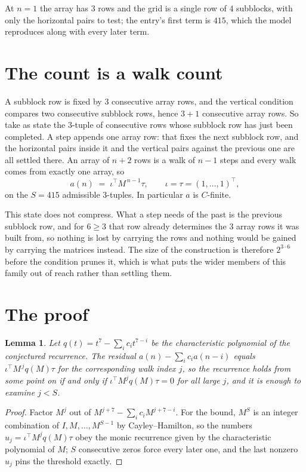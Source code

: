 \documentclass[11pt,a4paper]{article}
\theoremstyle{plain}
\newtheorem{lemma}[theorem]{Lemma}
\theoremstyle{definition}
\begin{document}
At $n=1$ the array has $3$ rows and the grid is a single row of $4$
subblocks, with only the horizontal pairs to test; the entry's first term is
$415$, which the model reproduces along with every later term.

\section{The count is a walk count}

A subblock row is fixed by $3$ consecutive array rows, and the vertical condition compares
two consecutive subblock rows, hence $3+1$ consecutive array rows. So take as state the
$3$-tuple of consecutive rows whose subblock row has just been completed. A step appends one
array row: that fixes the next subblock row, and the horizontal pairs inside it and the
vertical pairs against the previous one are all settled there. An array of $n+2$ rows is
a walk of $n-1$ steps and every walk comes from exactly one array, so
\[
a(n)\;=\;\iota^{\!\top}M^{\,n-1}\tau,\qquad\iota=\tau=(1,\dots,1)^{\!\top},
\]
on the $S=415$ admissible $3$-tuples. In particular $a$ is $C$-finite.

This state does not compress. What a step needs of the past is the previous subblock row, and
for $6\ge3$ that row already determines the $3$ array rows it was built from, so nothing
is lost by carrying the rows and nothing would be gained by carrying the matrices instead. The
size of the construction is therefore $2^{3\cdot6}$ before the condition prunes
it, which is what puts the wider members of this family out of reach rather than settling them.

\section{The proof}

\begin{lemma}\label{lem:crit}
Let $q(t)=t^{7}-\sum_i c_it^{7-i}$ be the characteristic polynomial of the
conjectured recurrence. The residual $a(n)-\sum_ic_ia(n-i)$ equals
$\iota^{\!\top}M^{\,j}q(M)\tau$ for the corresponding walk index $j$, so the recurrence
holds from some point on if and only if $\iota^{\!\top}M^{j}q(M)\tau=0$ for all large $j$,
and it is enough to examine $j<S$.
\end{lemma}

\begin{proof}
Factor $M^{j}$ out of $M^{j+7}-\sum_ic_iM^{j+7-i}$. For the bound, $M^{S}$
is an integer combination of $I,M,\dots,M^{S-1}$ by Cayley--Hamilton, so the numbers
$u_j=\iota^{\!\top}M^{j}q(M)\tau$ obey the monic recurrence given by the characteristic
polynomial of $M$; $S$ consecutive zeros force every later one, and the last nonzero $u_j$
pins the threshold exactly.
\end{proof}
\end{document}
